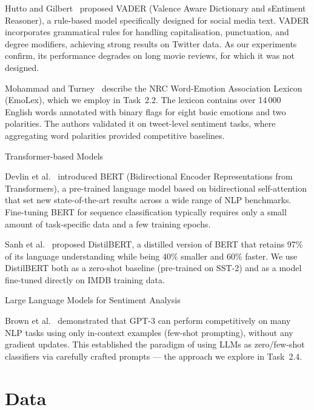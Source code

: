 \documentclass[12pt,reqno,twoside]{amsbook}
\makeatletter
\def\section{\@startsection{section}{1}%
      \z@{.5\linespacing\@plus.7\linespacing}{.25\linespacing}%
      {\normalfont\bfseries\flushleft}}
\theoremstyle{plain}
\numberwithin{equation}{chapter}
\numberwithin{section}{chapter}
\makeatother
\begin{document}
\noindent Hutto and Gilbert~\cite{hutto2014} proposed VADER (Valence Aware
Dictionary and sEntiment Reasoner), a rule-based model specifically designed for
social media text.
VADER incorporates grammatical rules for handling capitalisation, punctuation, and
degree modifiers, achieving strong results on Twitter data.
As our experiments confirm, its performance degrades on long movie reviews, for
which it was not designed.

Mohammad and Turney~\cite{mohammad2013} describe the NRC Word-Emotion Association
Lexicon (EmoLex), which we employ in Task~2.2.
The lexicon contains over 14\,000 English words annotated with binary flags for
eight basic emotions and two polarities.
The authors validated it on tweet-level sentiment tasks, where aggregating word
polarities provided competitive baselines.

\section{Transformer-based Models}

\noindent Devlin et al.~\cite{devlin2019} introduced BERT (Bidirectional Encoder
Representations from Transformers), a pre-trained language model based on
bidirectional self-attention that set new state-of-the-art results across a wide
range of NLP benchmarks.
Fine-tuning BERT for sequence classification typically requires only a small
amount of task-specific data and a few training epochs.

Sanh et al.~\cite{sanh2019} proposed DistilBERT, a distilled version of BERT that
retains 97\% of its language understanding while being 40\% smaller and 60\%
faster.
We use DistilBERT both as a zero-shot baseline (pre-trained on SST-2) and as a
model fine-tuned directly on IMDB training data.

\section{Large Language Models for Sentiment Analysis}

\noindent Brown et al.~\cite{brown2020} demonstrated that GPT-3 can perform
competitively on many NLP tasks using only in-context examples (few-shot
prompting), without any gradient updates.
This established the paradigm of using LLMs as zero/few-shot classifiers via
carefully crafted prompts --- the approach we explore in Task~2.4.

\chapter{Data}\label{ch:data}
\end{document}

